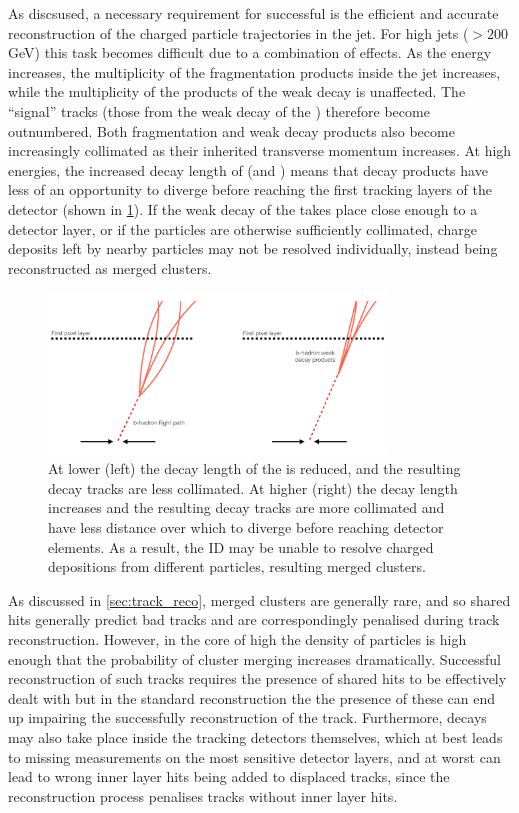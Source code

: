 As discsused, a necessary requirement for successful \btagging is the efficient and accurate reconstruction of the charged particle trajectories in the jet.
For high \pT jets (\pT $> 200$ GeV) this task becomes difficult due to a combination of effects.
As the \bhadron energy increases, the multiplicity of the fragmentation products inside the jet increases, while the multiplicity of the products of the weak decay is unaffected.
The ``signal'' tracks (those from the weak decay of the \bhadron) therefore become outnumbered.
Both fragmentation and \bhadron weak decay products also become increasingly collimated as their inherited transverse momentum increases.
At high energies, the increased decay length of \bhadrons (and \chadrons) means that decay products have less of an opportunity to diverge before reaching the first tracking layers of the detector (shown in \cref{fig:high_pt_b_decay}).
If the weak decay of the \bhadron takes place close enough to a detector layer, or if the particles are otherwise sufficiently collimated, charge deposits left by nearby particles may not be resolved individually, instead being reconstructed as merged clusters.

\begin{figure}[!htbp]
  \centering
  \includegraphics[width=0.8\textwidth]{chapters/3.tracking/figs/high_pt_b_decay.pdf}
  \caption{
    At lower \pt (left) the decay length of the \bhadron is reduced, and the resulting decay tracks are less collimated.
    At higher \pt (right) the \bhadron decay length increases and the resulting decay tracks are more collimated and have less distance over which to diverge before reaching detector elements.
    As a result, the ID may be unable to resolve charged depositions from different particles, resulting merged clusters.
  }
  \label{fig:high_pt_b_decay}
\end{figure}

As discussed in \cref{sec:track_reco}, merged clusters are generally rare, and so shared hits generally predict bad tracks and are correspondingly penalised during track reconstruction.
However, in the core of high \pT \bjets the density of particles is high enough that the probability of cluster merging increases dramatically.
Successful reconstruction of such tracks requires the presence of shared hits to be effectively dealt with but in the standard reconstruction the the presence of these can end up impairing the successfully reconstruction of the track.
Furthermore, decays may also take place inside the tracking detectors themselves, which at best leads to missing measurements on the most sensitive detector layers, and at worst can lead to wrong inner layer hits being added to displaced tracks, since the reconstruction process penalises tracks without inner layer hits.


